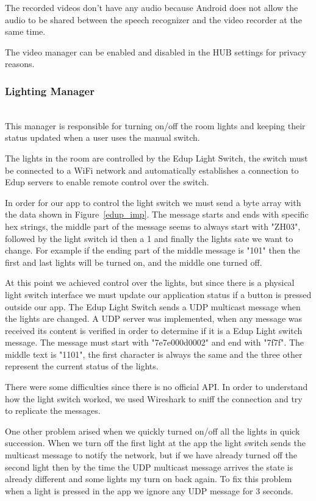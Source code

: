The recorded videos don't have any audio because Android does not allow the audio to be shared between the speech recognizer and the video recorder at the same time.

The video manager can be enabled and disabled in the HUB settings for privacy reasons.



\subsubsection{Lighting Manager}\mbox{}\\

This manager is responsible for turning on/off the room lights and keeping their status updated when a user uses the manual switch.


The lights in the room are controlled by the Edup Light Switch, the switch must be connected to a WiFi network and automatically establishes a connection to Edup servers to enable remote control over the switch.

In order for our app to control the light switch we must send a byte array with the data shown in Figure~\ref{edup_imp}.
The message starts and ends with specific hex strings, the middle part of the message seems to always start with "ZH03", followed by the light switch id then a 1 and finally the lights sate we want to change. For example if the ending part of the middle message is "101" then the first and last lights will be turned on, and the middle one turned off.

At this point we achieved control over the lights, but since there is a physical light switch interface we must update our application status if a button is pressed outside our app.
The Edup Light Switch sends a \ac{UDP} multicast message when the lights are changed. A \ac{UDP} server was implemented, when any message was received its content is verified in order to determine if it is a Edup Light switch message. The message must start with "7e7e000d0002" and end with "7f7f". The middle text is "1101", the first character is always the same and the three other represent the current status of the lights.

There were some difficulties since there is no official API. In order to understand how the light switch worked, we used Wireshark to sniff the connection and try to replicate the messages.

One other problem arised when we quickly turned on/off all the lights in quick succession. When we turn off the first light at the app the light switch sends the multicast message to notify the network, but if we have already turned off the second light then by the time the \ac{UDP} multicast message arrives the state is already different and some lights my turn on back again. To fix this problem when a light is pressed in the app we ignore any \ac{UDP} message for 3 seconds.



